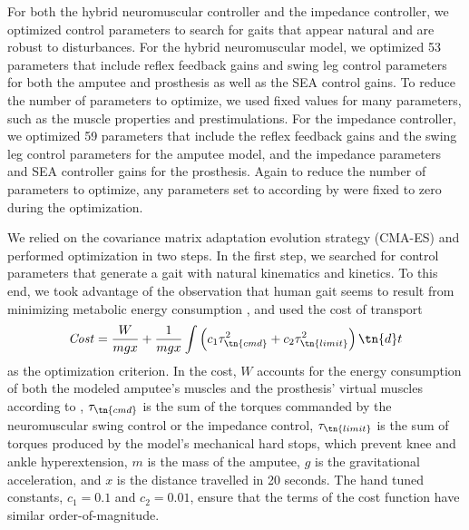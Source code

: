 For both the hybrid neuromuscular controller and the impedance controller, we
optimized control parameters to search for gaits that appear natural and are
robust to disturbances. For the hybrid neuromuscular model, we optimized 53
parameters that include reflex feedback gains and swing leg control parameters
for both the amputee and prosthesis as well as the SEA control gains. To reduce
the number of parameters to optimize, we used fixed values for many parameters,
such as the muscle properties and prestimulations. For the impedance controller,
we optimized 59 parameters that include the reflex feedback gains and the swing
leg control parameters for the amputee model, and the impedance parameters and
SEA controller gains for the prosthesis. Again to reduce the number of
parameters to optimize, any parameters set to according by \citet{sup2008design}
were fixed to zero during the optimization. 

We relied on the covariance matrix adaptation evolution strategy (CMA-ES)
\citep{hansen2006cma} and performed optimization in two steps. In the first step,
we searched for control parameters that generate a gait with natural kinematics
and kinetics. To this end, we took advantage of the observation that human gait
seems to result from minimizing metabolic energy consumption
\citep{mcneill2002energetics}, and used the cost of transport 
\begin{align}
    \mathit{Cost} = \frac{W}{mgx} + \frac{1}{mgx} \int \left( 
        c_1\tau_\tn{cmd}^2  + c_2 \tau_\tn{limit}^2 \right) \tn{d}t
    \label{eq:costfuncenergy}
\end{align}
as the optimization criterion. In the cost, $W$ accounts for the energy consumption
of both the modeled amputee's muscles and the prosthesis' virtual muscles
according to \citet{umberger2003model}, $\tau_\tn{cmd}$ is the sum of the
torques commanded by the neuromuscular swing control or the impedance control,
$\tau_\tn{limit}$ is the sum of torques produced by the model's mechanical
hard stops, which prevent knee and ankle hyperextension, $m$ is the mass of the
amputee, $g$ is the gravitational acceleration, and $x$ is the distance
travelled in 20 seconds. The hand tuned constants, $c_1 = 0.1$ and $c_2 = 0.01$,
ensure that the terms of the cost function have similar order-of-magnitude. 

